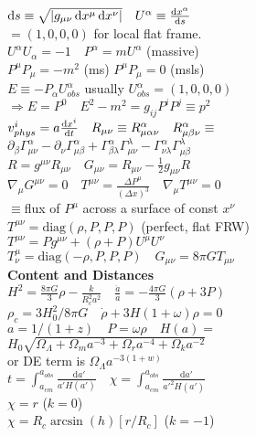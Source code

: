 \documentclass[12pt]{article}
\newcommand*\diff{\mathop{}\!\mathrm{d}}
\newcommand{\chris}[3]{\Gamma_{#1#2}^{#3}}
\begin{document}
{	\\$\diff s \equiv \sqrt{\abs{g_{\mu\nu}\diff x^\mu \diff x^\nu}} \quad U^\alpha\equiv\dv{x^\alpha}{s}$
	\\$=(1,0,0,0)$ for local flat frame.
	\\$U^\alpha U_\alpha = -1 \quad P^\alpha=m U^\alpha$ (massive)
	\\$P^\mu P_\mu=-m^2$ (ms) $P^\mu P_\mu=0$ (msls)
	\\$E\equiv-P_\alpha U^\alpha_{obs}$ usually $U_{obs}^\alpha = (1,0,0,0)$
	\\$\Rightarrow E=P^0 \quad E^2-m^2=g_{ij}P^iP^j\equiv p^2$
	\\$v^i_{phys}=a\dv{x^i}{t} \quad R_{\mu\nu}\equiv R^\alpha_{\mu\alpha\nu} \quad R^\alpha_{\mu\beta\nu}\equiv$
	\\$\partial_\beta\chris{\mu}{\nu}{\alpha} - \partial_\nu\chris{\mu}{\beta}{\alpha}+\chris{\beta}{\lambda}{\alpha}\chris{\mu}{\nu}{\lambda}-\chris{\nu}{\lambda}{\alpha}\chris{\mu}{\beta}{\lambda}$
	\\$R=g^{\mu\nu}R_{\mu\nu} \quad G_{\mu\nu}=R_{\mu\nu}-\frac{1}{2}g_{\mu\nu}R$
	\\$\nabla_\mu G^{\mu\nu}=0 \quad T^{\mu\nu}=\frac{\Delta P^\mu}{(\Delta x)^3} \quad \nabla_\mu T^{\mu\nu}=0 $
	\\$\equiv$flux of $P^\mu$ across a surface of const $x^\nu$
	\\$T^{\mu\nu}=\text{diag}(\rho,P,P,P)$ (perfect, flat FRW)
	\\$T^{\mu\nu}=Pg^{\mu\nu}+(\rho+P)U^\mu U^\nu$
	\\$T_\nu^\mu=\text{diag}(-\rho, P, P,P) \quad G_{\mu\nu}=8\pi GT_{\mu\nu}$
	\\\textbf{Content and Distances}
	\\$H^2=\frac{8\pi G}{3}\rho -\frac{k}{R_c^2a^2} \quad \frac{\ddot{a}}{a}=-\frac{4\pi G}{3}(\rho +3 P)$
	\\$\rho_c={3H_0^2}/{8\pi G} \quad \dot{\rho}+3H(1+\omega)\rho=0$
	\\$a=1/(1+z)  \quad P=\omega\rho \quad H(a)=$
	\\$H_0\sqrt{\Omega_\Lambda+\Omega_ma^{-3}+\Omega_ra^{-4}+\Omega_ka^{-2}}$
	\\or DE term is $\Omega_\Lambda a^{-3(1+w)}$
	\\$t=\int_{a_{em}}^{a_{obs}}\frac{\diff a'}{a'H(a')} \quad\chi=\int_{a_{em}}^{a_{obs}}\frac{\diff a'}{a'^2H(a')}$
	\\$\chi=r$ ($k=0$) 
	\\$\chi=R_c\arcsin(h)[r/R_c]$ ($k=-1$)
}
\end{document}
